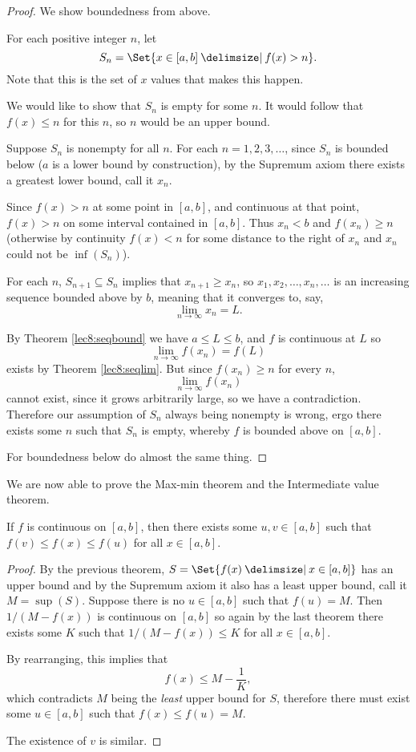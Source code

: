 \begin{proof}
	We show boundedness from above.

	For each positive integer $n$, let
	\[
		S_n = \Set{x \in [a, b] \given f(x) > n}.
	\]
	Note that this is the set of $x$ values that makes this happen.

	We would like to show that $S_n$ is empty for some $n$.
	It would follow that $f(x) \leq n$ for this $n$, so $n$ would be an upper bound.

	Suppose $S_n$ is nonempty for all $n$.
	For each $n = 1, 2, 3, \ldots$, since $S_n$ is bounded below ($a$ is a lower bound by construction), by the Supremum axiom there exists a greatest lower bound, call it $x_n$.

	Since $f(x) > n$ at some point in $[a, b]$, and continuous at that point, $f(x) > n$ on some interval contained in $[a, b]$.
	Thus $x_n < b$ and $f(x_n) \geq n$ (otherwise by continuity $f(x) < n$ for some distance to the right of $x_n$ and $x_n$ could not be $\inf(S_n)$).

	For each $n$, $S_{n + 1} \subseteq S_n$ implies that $x_{n + 1} \geq x_n$, so $x_1, x_2, \ldots, x_n, \ldots$ is an increasing sequence bounded above by $b$, meaning that it converges to, say,
	\[
		\lim_{n \to \infty} x_n = L.
	\]

	\noindent
	By Theorem \ref{lec8:seqbound} we have $a \leq L \leq b$, and $f$ is continuous at $L$ so
	\[
		\lim_{n \to \infty} f(x_n) = f(L)
	\]
	exists by Theorem \ref{lec8:seqlim}.
	But since $f(x_n) \geq n$ for every $n$,
	\[
		\lim_{n \to \infty} f(x_n)
	\]
	cannot exist, since it grows arbitrarily large, so we have a contradiction.
	Therefore our assumption of $S_n$ always being nonempty is wrong, ergo there exists some $n$ such that $S_n$ is empty, whereby $f$ is bounded above on $[a, b]$.

	For boundedness below do almost the same thing.
\end{proof}

\noindent
We are now able to prove the Max-min theorem and the Intermediate value theorem.

\begin{theorem}
	If $f$ is continuous on $[a, b]$, then there exists some $u, v \in [a, b]$ such that $f(v) \leq f(x) \leq f(u)$ for all $x \in [a, b]$.
\end{theorem}

\begin{proof}
	By the previous theorem, $S = \Set{f(x) \given x \in [a, b]}$ has an upper bound and by the Supremum axiom it also has a least upper bound, call it $M = \sup(S)$.
	Suppose there is no $u \in [a, b]$ such that $f(u) = M$.
	Then $1 / (M - f(x))$ is continuous on $[a, b]$ so again by the last theorem there exists some $K$ such that $1 / (M - f(x)) \leq K$ for all $x \in [a, b]$.

	By rearranging, this implies that
	\[
		f(x) \leq M - \frac{1}{K},
	\]
	which contradicts $M$ being the \emph{least} upper bound for $S$, therefore there must exist some $u \in [a, b]$ such that $f(x) \leq f(u) = M$.

	The existence of $v$ is similar.
\end{proof}

